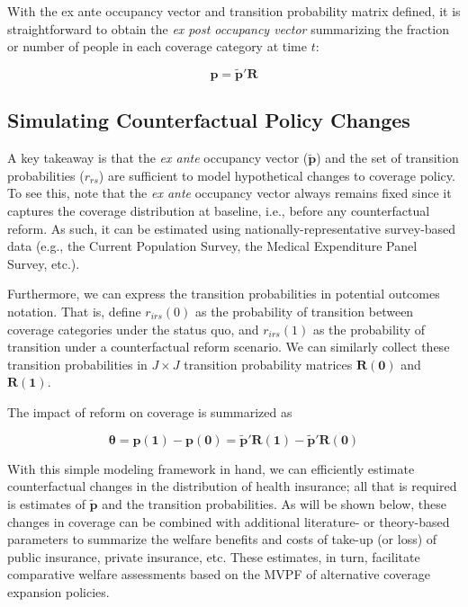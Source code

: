 \documentclass[
  10pt,
]{article}
\begin{document}
With the ex ante occupancy vector and transition probability matrix
defined, it is straightforward to obtain the \emph{ex post occupancy
vector} summarizing the fraction or number of people in each coverage
category at time \(t\):

\begin{equation}
\label{eq:expost_1}
\boldsymbol{p} = \boldsymbol{\tilde{p}'R}
\end{equation}

\hypertarget{simulating-counterfactual-policy-changes}{%
\subsection{Simulating Counterfactual Policy
Changes}\label{simulating-counterfactual-policy-changes}}

A key takeaway is that the \emph{ex ante} occupancy vector
(\(\boldsymbol{\tilde{p}}\)) and the set of transition probabilities
(\(r_{rs}\)) are sufficient to model hypothetical changes to coverage
policy. To see this, note that the \emph{ex ante} occupancy vector
always remains fixed since it captures the coverage distribution at
baseline, i.e., before any counterfactual reform. As such, it can be
estimated using nationally-representative survey-based data (e.g., the
Current Population Survey, the Medical Expenditure Panel Survey, etc.).

Furthermore, we can express the transition probabilities in potential
outcomes notation. That is, define \(r_{irs}(0)\) as the probability of
transition between coverage categories under the status quo, and
\(r_{irs}(1)\) as the probability of transition under a counterfactual
reform scenario. We can similarly collect these transition probabilities
in \(J \times J\) transition probability matrices \(\boldsymbol{R(0)}\)
and \(\boldsymbol{R(1)}\).

The impact of reform on coverage is summarized as

\begin{equation}
\label{eq:takeup_potout}
  \boldsymbol{\theta} = \boldsymbol{p(1)} -  \boldsymbol{p(0)} 
  = \boldsymbol{\tilde{p}'R(1)} - \boldsymbol{\tilde{p}'R(0)}
\end{equation}

With this simple modeling framework in hand, we can efficiently estimate
counterfactual changes in the distribution of health insurance; all that
is required is estimates of \(\boldsymbol{\tilde{p}}\) and the
transition probabilities. As will be shown below, these changes in
coverage can be combined with additional literature- or theory-based
parameters to summarize the welfare benefits and costs of take-up (or
loss) of public insurance, private insurance, etc. These estimates, in
turn, facilitate comparative welfare assessments based on the MVPF of
alternative coverage expansion policies.
\end{document}

